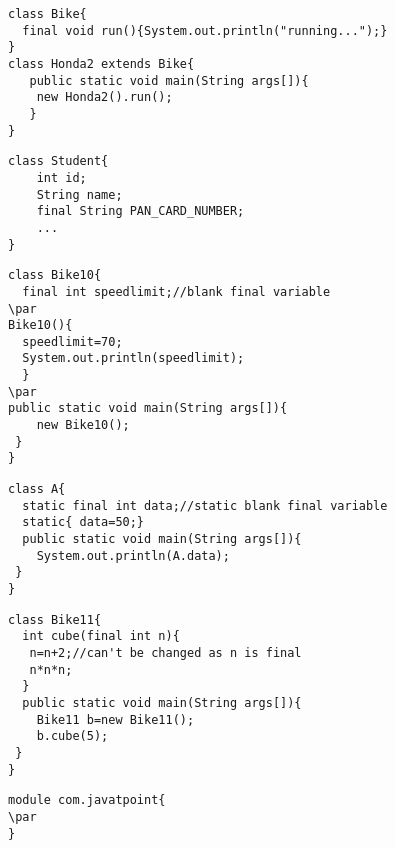 \documentclass{book}
\def\lthtmlcheckvsize{\ifdim\ht\sizebox<\vsize 
  \ifdim\wd\sizebox<\hsize\expandafter\hfill\fi \expandafter\vfill
  \else\expandafter\vss\fi}%
\begin{document}
{\newpage\clearpage
{}%
\begin{lstlisting}
class Bike{  
  final void run(){System.out.println("running...");}  
}  
class Honda2 extends Bike{  
   public static void main(String args[]){  
    new Honda2().run();  
   }  
}  
\end{lstlisting}%
\lthtmlfigureZ
\lthtmlcheckvsize\clearpage}

{\newpage\clearpage
{}%
\begin{lstlisting}
class Student{  
	int id;  
	String name;  
	final String PAN_CARD_NUMBER;  
	...  
}  
\end{lstlisting}%
\lthtmlfigureZ
\lthtmlcheckvsize\clearpage}

{\newpage\clearpage
{}%
\begin{lstlisting}
class Bike10{  
  final int speedlimit;//blank final variable  
\par
Bike10(){  
  speedlimit=70;  
  System.out.println(speedlimit);  
  }  
\par
public static void main(String args[]){  
    new Bike10();  
 }  
}  
\end{lstlisting}%
\lthtmlfigureZ
\lthtmlcheckvsize\clearpage}

{\newpage\clearpage
{}%
\begin{lstlisting}
class A{  
  static final int data;//static blank final variable  
  static{ data=50;}  
  public static void main(String args[]){  
    System.out.println(A.data);  
 }  
}  
\end{lstlisting}%
\lthtmlfigureZ
\lthtmlcheckvsize\clearpage}

{\newpage\clearpage
{}%
\begin{lstlisting}
class Bike11{  
  int cube(final int n){  
   n=n+2;//can't be changed as n is final  
   n*n*n;  
  }  
  public static void main(String args[]){  
    Bike11 b=new Bike11();  
    b.cube(5);  
 }  
}  
\end{lstlisting}%
\lthtmlfigureZ
\lthtmlcheckvsize\clearpage}

{\newpage\clearpage
{}%
\begin{lstlisting}
module com.javatpoint{  
\par
}  
\end{lstlisting}%
\lthtmlfigureZ
\lthtmlcheckvsize\clearpage}
\end{document}
